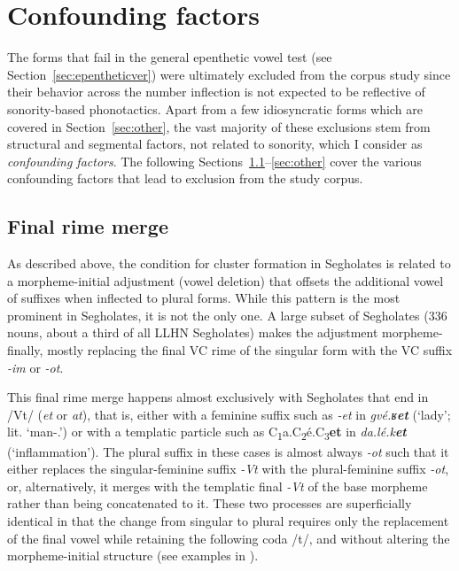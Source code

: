 \section{Confounding factors}\label{sec:confounding}

The forms that fail in the general epenthetic vowel test (see Section~\ref{sec:epentheticver}) were ultimately excluded from the corpus study since their behavior across the number inflection is not expected to be reflective of sonority-based phonotactics. Apart from a few idiosyncratic forms which are covered in Section~\ref{sec:other}, the vast majority of these exclusions stem from structural and segmental factors, not related to sonority, which I consider as \emph{confounding factors}. The following Sections~\ref{sec:finalrime}--\ref{sec:other} cover the various confounding factors that lead to exclusion from the study corpus.

\subsection{Final rime merge}\label{sec:finalrime}

As described above, the condition for cluster formation in Segholates is related to a morpheme-initial adjustment (vowel deletion) that offsets the additional vowel of suffixes when inflected to plural forms. While this pattern is the most prominent in Segholates, it is not the only one. A large subset of Segholates (336 nouns, about a third of all LLHN Segholates) makes the adjustment morpheme-finally, mostly replacing the final VC rime of the singular form with the VC suffix \emph{-im} or \emph{-ot}.

This final rime merge happens almost exclusively with Segholates that end in /Vt/ (\emph{et} or \emph{at}), that is, either with a feminine suffix such as \emph{-et} in \emph{gvé.ʁ\textbf{et}} (`lady'; lit. `man-\Sg{}.\F{}') or with a templatic particle such as C\textsubscript{1}a.C\textsubscript{2}é.C\textsubscript{3}\textbf{et} in \emph{da.lé.k\textbf{et}} (`inflammation'). The plural suffix in these cases is almost always \emph{-ot} such that it either replaces the singular-feminine suffix \emph{-Vt} with the plural-feminine suffix \emph{-ot}, or, alternatively, it merges with the templatic final \emph{-Vt} of the base morpheme rather than being concatenated to it. These two processes are superficially identical in that the change from singular to plural requires only the replacement of the final vowel while retaining the following coda /t/, and without altering the morpheme-initial structure (see examples in ).

